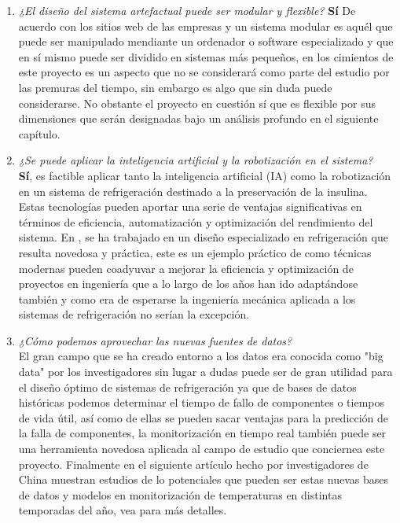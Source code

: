 \begin{enumerate}
	
	\item \textit{¿El diseño del sistema artefactual puede ser modular y flexible?}
	\textbf{Sí} De acuerdo con los sitios web de las empresas \citeauthor{hogartecnocasa-2016} y \citeauthor{neoattack-2023} un sistema modular es aquél que puede ser manipulado mendiante un ordenador o software especializado y que en sí mismo puede ser dividido en sistemas más pequeños, en los cimientos de este proyecto es un aspecto que no se considerará como parte del estudio por las premuras del tiempo, sin embargo es algo que sin duda puede considerarse. No obstante el proyecto en cuestión sí que es flexible por sus dimensiones que serán designadas bajo un análisis profundo en el siguiente capítulo. 
	
	
\item 	\textit{¿Se puede aplicar la inteligencia artificial y la robotización en el sistema?}\\
\textbf{Sí}, es factible aplicar tanto la inteligencia artificial (IA) como la robotización en un sistema de refrigeración destinado a la preservación de la insulina. Estas tecnologías pueden aportar una serie de ventajas significativas en términos de eficiencia, automatización y optimización del rendimiento del sistema. En  \citeyear{madriz-ramirez-2022}, se ha trabajado en un diseño especializado en refrigeración que resulta novedosa y práctica, este es un ejemplo práctico de como técnicas modernas pueden coadyuvar a mejorar la eficiencia y optimización de proyectos en ingeniería que a lo largo de los años han ido adaptándose también y como era de esperarse la ingeniería mecánica aplicada a los sistemas de refrigeración no serían la excepción.

\item 	\textit{¿Cómo podemos aprovechar las nuevas fuentes de datos?}\\
El gran campo que se ha creado entorno a los datos era conocida como "big data" por los investigadores sin lugar a dudas puede ser de gran utilidad para el diseño óptimo de sistemas de refrigeración ya que de bases de datos históricas podemos determinar el tiempo de fallo de componentes o tiempos de vida útil, así como de ellas se pueden sacar ventajas para la predicción de la falla de componentes, la monitorización en tiempo real también puede ser una herramienta novedosa aplicada al campo de estudio que conciernea este proyecto. Finalmente en el siguiente artículo  hecho por investigadores de China muestran estudios de lo potenciales que pueden ser estas nuevas bases de datos y modelos en monitorización de temperaturas en distintas temporadas del año, vea \cite{liu-2021} para más detalles.



\end{enumerate}
